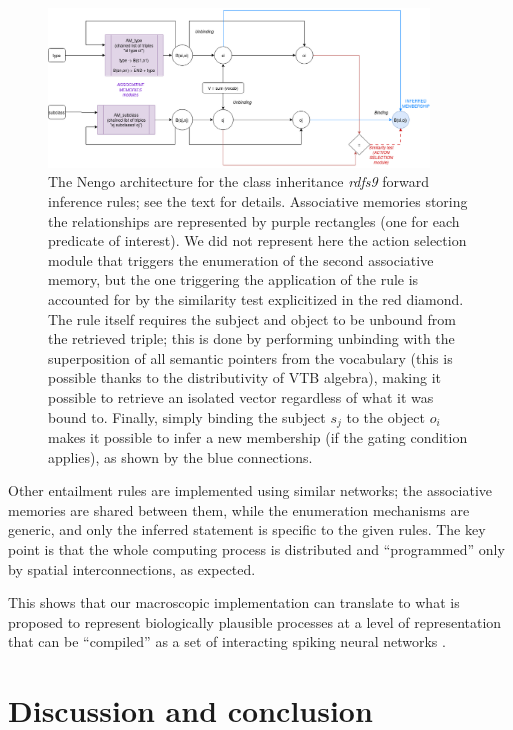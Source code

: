 \documentclass[sn-mathphys]{sn-jnl}
\begin{document}
\begin{figure}
\centerline{\includegraphics[width=0.9\textwidth]{./architecture_aristotle.png}}
\caption{The Nengo architecture for the class inheritance \textit{rdfs9} forward inference rules; see the text for details. Associative memories storing the relationships are represented by purple rectangles (one for each predicate of interest). We did not represent here the action selection module that triggers the enumeration of the second associative memory, but the one triggering the application of the rule is accounted for by the similarity test explicitized in the red diamond. The rule itself requires the subject and object to be unbound from the retrieved triple; this is done by performing unbinding with the superposition of all semantic pointers from the vocabulary (this is possible thanks to the distributivity of VTB algebra), making it possible to retrieve an isolated vector regardless of what it was bound to. Finally, simply binding the subject $s_j$ to the object $o_i$ makes it possible to infer a new membership (if the gating condition applies), as shown by the blue connections.}
\label{architecture_aristotle}
\end{figure}


Other entailment rules are implemented using similar networks; the associative memories are shared between them, while the enumeration mechanisms are generic, and only the inferred statement is specific to the given rules. The key point is that the whole computing process is distributed and ``programmed'' only by spatial interconnections, as expected.

This shows that our macroscopic implementation can translate to what is proposed to represent biologically plausible processes at a level of representation that can be ``compiled'' as a set of interacting spiking neural networks \cite{eliasmith_how_2013}.

\section{Discussion and conclusion}
\end{document}
